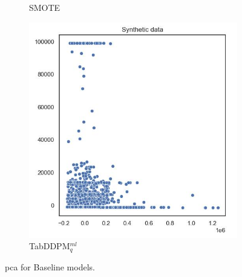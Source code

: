 \begin{figure}[H]
\begin{subfigure}{0.3\textwidth}
		\caption{SMOTE}
	\end{subfigure}
	\begin{subfigure}{0.3\textwidth}
		\centering
		\includegraphics[width=\textwidth]{images/pca/tab-ddpm.jpg}
		\caption{TabDDPM$^{ml}_q$}
	\end{subfigure}
	\caption[PCA plots Baseline Models]{\gls{pca} for Baseline models.}
	\label{fig:pca_base}
\end{figure}


